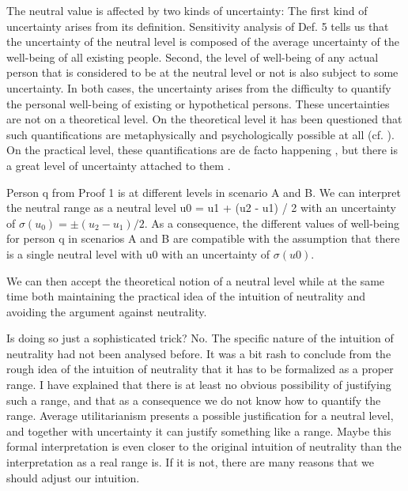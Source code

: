 The neutral value is affected by two kinds of uncertainty: The first kind of uncertainty arises from its definition. Sensitivity analysis of Def. 5 tells us that the uncertainty of the neutral level is composed of the average uncertainty of the well-being of all existing people. Second, the level of well-being of any actual person that is considered to be at the neutral level or not is also subject to some uncertainty. In both cases, the uncertainty arises from the difficulty to quantify the personal well-being of existing or hypothetical persons. These uncertainties are not on a theoretical level. On the theoretical level it has been questioned that such quantifications are metaphysically and psychologically possible at all (cf. ). On the practical level, these quantifications are de facto happening \cite[ch.~9]{broome_2004}, but there is a great level of uncertainty attached to them .  

Person q from Proof 1 is at different levels in scenario A and B. We can interpret the neutral range as a neutral level u0 = u1 + (u2 - u1) / 2 with an uncertainty of $\sigma (u_0) = \pm (u_2 - u_1) / 2$. As a consequence, the different values of well-being for person q in scenarios A and B are compatible with the assumption that there is a single neutral level with u0 with an uncertainty of $\sigma(u0)$.  

We can then accept the theoretical notion of a neutral level while at the same time both maintaining the practical idea of the intuition of neutrality and avoiding the argument against neutrality.  

Is doing so just a sophisticated trick? No. The specific nature of the intuition of neutrality had not been analysed before. It was a bit rash to conclude from the rough idea of the intuition of neutrality that it has to be formalized as a proper range. I have explained that there is at least no obvious possibility of justifying such a range, and that as a consequence we do not know how to quantify the range. Average utilitarianism presents a possible justification for a neutral level, and together with uncertainty it can justify something like a range. \todo{} Maybe this formal interpretation is even closer to the original intuition of neutrality than the interpretation as a real range is. If it is not, there are  many reasons that we should adjust our intuition.  
